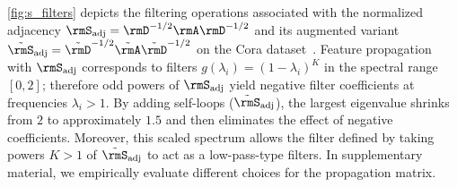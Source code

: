\autoref{fig:s_filters} depicts the filtering operations associated with the normalized adjacency $\rmS_{\text{adj}} = \rmD^{-1/2}\rmA\rmD^{-1/2}$ and its augmented variant $\tilde{\rmS}_{\text{adj}} =  \tilde{\rmD}^{-1/2}\tilde{\rmA}\tilde{\rmD}^{-1/2}$ on the Cora dataset~\citep{sen2008collective}. Feature propagation with $\rmS_{\text{adj}}$ corresponds to filters $g(\lambda_i) = (1-\lambda_i)^K$ in the spectral range $[0, 2]$; therefore odd powers of $\rmS_{\text{adj}}$ yield negative filter coefficients at frequencies $\lambda_i > 1$. By adding self-loops ($\tilde{\rmS}_{\text{adj}}$), the largest eigenvalue shrinks from $2$ to approximately $1.5$ and then eliminates the effect of negative coefficients. Moreover, this scaled spectrum allows the filter defined by taking powers $K>1$ of $\tilde{\rmS}_{\text{adj}}$ to act as a low-pass-type filters. In supplementary material, we empirically evaluate different choices for the propagation matrix.